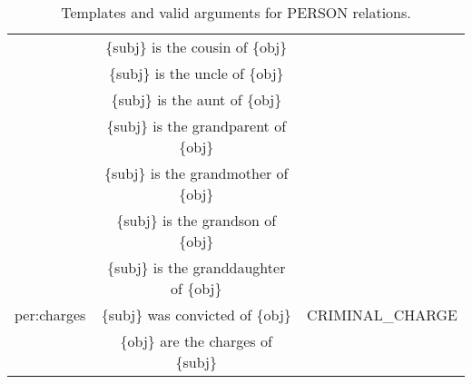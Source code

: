 \documentclass[11pt]{article}
\begin{document}
\begin{table*}[t]
{\begin{tabular}{rcl}
             & \{subj\} is the cousin of \{obj\} & \\
             & \{subj\} is the uncle of \{obj\} & \\
             & \{subj\} is the aunt of \{obj\} & \\
             & \{subj\} is the grandparent of \{obj\} & \\
             & \{subj\} is the grandmother of \{obj\} & \\
             & \{subj\} is the grandson of \{obj\} & \\
             & \{subj\} is the granddaughter of \{obj\} & \\
            per:charges & \{subj\} was convicted of \{obj\} & CRIMINAL\_CHARGE \\
             & \{obj\} are the charges of \{subj\} & \\
            
        
            \bottomrule
        \end{tabular}
    }
    \caption{Templates and valid arguments for PERSON relations.}
    \label{tab:per_templates}
\end{table*}
\end{document}
